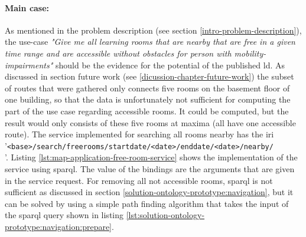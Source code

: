 \documentclass[draft,final]{vutinfth} %
\begin{document}
\paragraph{Main case:} As mentioned in the problem description (see section \ref{intro-problem-description}), the use-case \textit{"Give me all learning rooms that are nearby that are free in a given time range and are accessible without obstacles for person with mobility-impairments"} should be the evidence for the potential of the published \gls{ld}. As discussed in section future work (see \ref{dicussion-chapter-future-work}) the subset of routes that were gathered only connects five rooms on the basement floor of one building, so that the data is unfortunately not sufficient for computing the part of the use case regarding accessible rooms. It could be  computed, but the result would  only consists of these five rooms at maxima (all have one accessible route). The service implemented for searching all rooms nearby has the \gls{iri} '\texttt{<base>/search/freerooms/startdate/<date>/enddate/<date>/nearby/\\<long,lat>}'. Listing \ref{lst:map-application-free-room-service} shows the implementation of the service using \gls{sparql}. The value of the bindings are the arguments that are given in the service request. For removing all not accessible rooms, \gls{sparql} is not sufficient as discussed in section \ref{solution-ontology-prototype:navigation}, but it can be solved by using a simple path finding algorithm that takes the input of the \gls{sparql} query shown in listing \ref{lst:solution-ontology-prototype:navigation:prepare}.
\end{document}
